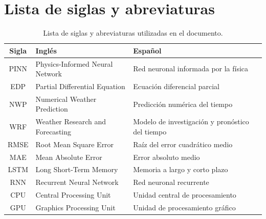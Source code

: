 \chapter*{Lista de siglas y abreviaturas}

\begin{table}[H]
\centering
\renewcommand{\arraystretch}{1.3} %
\setlength{\tabcolsep}{6pt}       %
\begin{tabularx}{\textwidth}{|c|X|X|}
\hline
\textbf{Sigla} & \textbf{Inglés} & \textbf{Español} \\ \hline
PINN   & Physics-Informed Neural Network & Red neuronal informada por la física \\ \hline
EDP    & Partial Differential Equation & Ecuación diferencial parcial \\ \hline
NWP    & Numerical Weather Prediction & Predicción numérica del tiempo \\ \hline
WRF    & Weather Research and Forecasting & Modelo de investigación y pronóstico del tiempo \\ \hline
RMSE   & Root Mean Square Error & Raíz del error cuadrático medio \\ \hline
MAE    & Mean Absolute Error & Error absoluto medio \\ \hline
LSTM   & Long Short-Term Memory & Memoria a largo y corto plazo \\ \hline
RNN    & Recurrent Neural Network & Red neuronal recurrente \\ \hline
CPU    & Central Processing Unit & Unidad central de procesamiento \\ \hline
GPU    & Graphics Processing Unit & Unidad de procesamiento gráfico \\ \hline
\end{tabularx}
\caption{Lista de siglas y abreviaturas utilizadas en el documento.}
\end{table}


